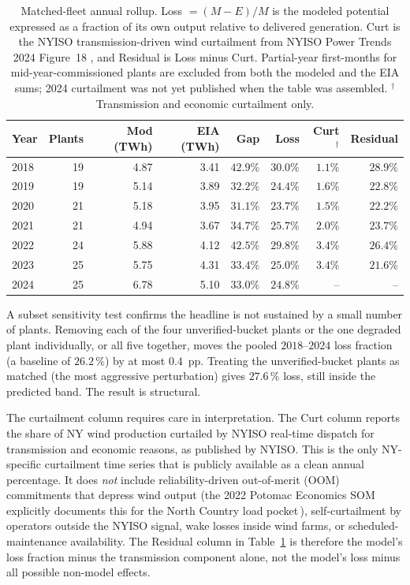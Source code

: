 \documentclass[11pt]{article}
\begin{document}
\begin{table}[h]
\centering
\small
\begin{tabular}{lrrrrrrr}
\toprule
Year & Plants & Mod (TWh) & EIA (TWh) & Gap & Loss & Curt$^\dagger$ & Residual \\
\midrule
2018 & 19 & 4.87 & 3.41 & $42.9\%$ & $30.0\%$ & $1.1\%$ & $28.9\%$ \\
2019 & 19 & 5.14 & 3.89 & $32.2\%$ & $24.4\%$ & $1.6\%$ & $22.8\%$ \\
2020 & 21 & 5.18 & 3.95 & $31.1\%$ & $23.7\%$ & $1.5\%$ & $22.2\%$ \\
2021 & 21 & 4.94 & 3.67 & $34.7\%$ & $25.7\%$ & $2.0\%$ & $23.7\%$ \\
2022 & 24 & 5.88 & 4.12 & $42.5\%$ & $29.8\%$ & $3.4\%$ & $26.4\%$ \\
2023 & 25 & 5.75 & 4.31 & $33.4\%$ & $25.0\%$ & $3.4\%$ & $21.6\%$ \\
2024 & 25 & 6.78 & 5.10 & $33.0\%$ & $24.8\%$ &     -- &     -- \\
\bottomrule
\end{tabular}
\caption{Matched-fleet annual rollup. Loss $=(M-E)/M$ is the modeled
potential expressed as a fraction of its own output relative to
delivered generation. Curt is the NYISO transmission-driven wind
curtailment from NYISO Power Trends 2024 Figure~18
\cite{nyiso2024powertrends}, and Residual is Loss minus Curt. Partial-year
first-months for mid-year-commissioned plants are excluded from both the
modeled and the EIA sums; 2024 curtailment was not yet published when
the table was assembled. $^\dagger$ Transmission and economic
curtailment only.}
\label{tab:eia923_fleet}
\end{table}

A subset sensitivity test confirms the headline
is not sustained by a small number of plants. Removing each of the four
unverified-bucket plants or the one degraded plant individually, or all
five together, moves the pooled $2018$--$2024$ loss fraction (a baseline
of $26.2\,\%$) by at most $0.4$~pp. Treating the unverified-bucket plants
as matched (the most aggressive perturbation) gives $27.6\,\%$ loss,
still inside the predicted band. The result is structural.

The curtailment column requires care in interpretation.
The Curt column reports the share of NY wind production curtailed by
NYISO real-time dispatch for transmission and economic reasons, as
published by NYISO. This is the only NY-specific curtailment time series
that is publicly available as a clean annual percentage. It does
\emph{not} include reliability-driven out-of-merit (OOM) commitments
that depress wind output (the 2022 Potomac Economics SOM explicitly
documents this for the North Country load
pocket\,\cite{nyiso2022som}), self-curtailment by operators outside the
NYISO signal, wake losses inside wind farms, or scheduled-maintenance
availability. The Residual column in Table~\ref{tab:eia923_fleet} is
therefore the model's loss fraction minus the transmission component
alone, not the model's loss minus all possible non-model effects.
\end{document}
